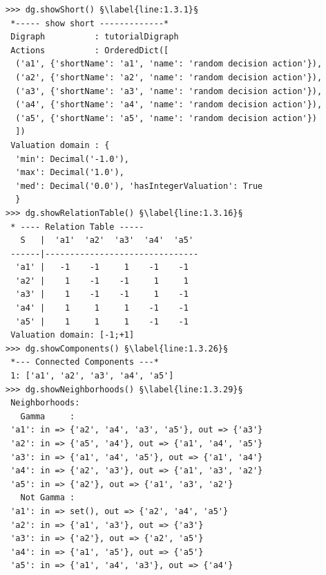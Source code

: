 \begin{lstlisting}[caption={Random crisp digraph object},label=list:1.3]
>>> dg.showShort() §\label{line:1.3.1}§
 *----- show short -------------*
 Digraph          : tutorialDigraph
 Actions          : OrderedDict([
  ('a1', {'shortName': 'a1', 'name': 'random decision action'}),
  ('a2', {'shortName': 'a2', 'name': 'random decision action'}),
  ('a3', {'shortName': 'a3', 'name': 'random decision action'}),
  ('a4', {'shortName': 'a4', 'name': 'random decision action'}),
  ('a5', {'shortName': 'a5', 'name': 'random decision action'})
  ])
 Valuation domain : {
  'min': Decimal('-1.0'),
  'max': Decimal('1.0'),
  'med': Decimal('0.0'), 'hasIntegerValuation': True
  }
>>> dg.showRelationTable() §\label{line:1.3.16}§
 * ---- Relation Table -----
   S   |  'a1'  'a2'  'a3'  'a4'  'a5'
 ------|-------------------------------
  'a1' |   -1    -1     1    -1    -1
  'a2' |    1    -1    -1     1     1
  'a3' |    1    -1    -1     1    -1
  'a4' |    1     1     1    -1    -1
  'a5' |    1     1     1    -1    -1
 Valuation domain: [-1;+1]
>>> dg.showComponents() §\label{line:1.3.26}§
 *--- Connected Components ---*
 1: ['a1', 'a2', 'a3', 'a4', 'a5']
>>> dg.showNeighborhoods() §\label{line:1.3.29}§
 Neighborhoods:
   Gamma     :
 'a1': in => {'a2', 'a4', 'a3', 'a5'}, out => {'a3'}
 'a2': in => {'a5', 'a4'}, out => {'a1', 'a4', 'a5'}
 'a3': in => {'a1', 'a4', 'a5'}, out => {'a1', 'a4'}
 'a4': in => {'a2', 'a3'}, out => {'a1', 'a3', 'a2'}
 'a5': in => {'a2'}, out => {'a1', 'a3', 'a2'}
   Not Gamma :
 'a1': in => set(), out => {'a2', 'a4', 'a5'}
 'a2': in => {'a1', 'a3'}, out => {'a3'}
 'a3': in => {'a2'}, out => {'a2', 'a5'}
 'a4': in => {'a1', 'a5'}, out => {'a5'}
 'a5': in => {'a1', 'a4', 'a3'}, out => {'a4'}
\end{lstlisting}

